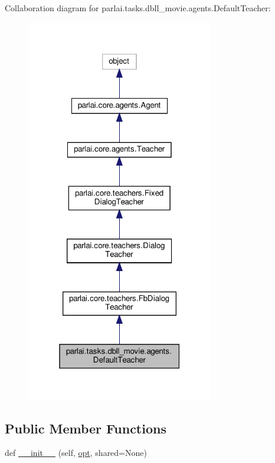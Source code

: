 Collaboration diagram for parlai.\+tasks.\+dbll\+\_\+movie.\+agents.\+Default\+Teacher\+:\nopagebreak
\begin{figure}[H]
\begin{center}
\leavevmode
\includegraphics[width=232pt]{da/d7b/classparlai_1_1tasks_1_1dbll__movie_1_1agents_1_1DefaultTeacher__coll__graph}
\end{center}
\end{figure}
\subsection*{Public Member Functions}
\begin{DoxyCompactItemize}
\item 
def \hyperlink{classparlai_1_1tasks_1_1dbll__movie_1_1agents_1_1DefaultTeacher_a66c1dbd7bb3e1b49e3c145235f1fffa0}{\+\_\+\+\_\+init\+\_\+\+\_\+} (self, \hyperlink{classparlai_1_1core_1_1teachers_1_1FbDialogTeacher_af7a9ec497b9cd0292d7b8fa220da7c28}{opt}, shared=None)
\end{DoxyCompactItemize}
